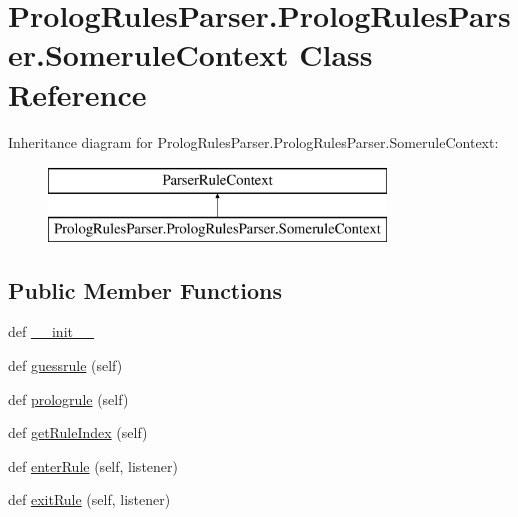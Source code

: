 \hypertarget{class_prolog_rules_parser_1_1_prolog_rules_parser_1_1_somerule_context}{}\section{Prolog\+Rules\+Parser.\+Prolog\+Rules\+Parser.\+Somerule\+Context Class Reference}
\label{class_prolog_rules_parser_1_1_prolog_rules_parser_1_1_somerule_context}
Inheritance diagram for Prolog\+Rules\+Parser.\+Prolog\+Rules\+Parser.\+Somerule\+Context\+:\begin{figure}[H]
\begin{center}
\leavevmode
\includegraphics[height=2.000000cm]{class_prolog_rules_parser_1_1_prolog_rules_parser_1_1_somerule_context}
\end{center}
\end{figure}
\subsection*{Public Member Functions}
\begin{DoxyCompactItemize}
\item 
def \hyperlink{class_prolog_rules_parser_1_1_prolog_rules_parser_1_1_somerule_context_a25a5a92579e005d3071c05bd345b8cff}{\+\_\+\+\_\+init\+\_\+\+\_\+}
\item 
def \hyperlink{class_prolog_rules_parser_1_1_prolog_rules_parser_1_1_somerule_context_acd836c262671089eb35e6eb1bcec9f8a}{guessrule} (self)
\item 
def \hyperlink{class_prolog_rules_parser_1_1_prolog_rules_parser_1_1_somerule_context_a1430dbc83eb2764af7b3413a945b91ec}{prologrule} (self)
\item 
def \hyperlink{class_prolog_rules_parser_1_1_prolog_rules_parser_1_1_somerule_context_afe07936790df4597a235fcd83cdd7c2e}{get\+Rule\+Index} (self)
\item 
def \hyperlink{class_prolog_rules_parser_1_1_prolog_rules_parser_1_1_somerule_context_ab711e8ecb7bfc9c5083e5b23095db2f0}{enter\+Rule} (self, listener)
\item 
def \hyperlink{class_prolog_rules_parser_1_1_prolog_rules_parser_1_1_somerule_context_a69339162cbcdd6d4fa5fd21250f5b877}{exit\+Rule} (self, listener)
\end{DoxyCompactItemize}

